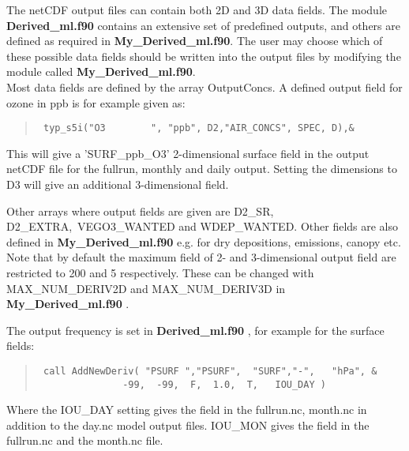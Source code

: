 % 

The netCDF output files can contain both 2D and 3D data fields. The module 
{ \bf Derived\_ml.f90 } contains an extensive set of predefined outputs, and
others are defined as required in { \bf My\_Derived\_ml.f90}. 
The user may choose which of these possible data fields should be written 
into the output files by modifying the module called { \bf My\_Derived\_ml.f90}.\\

Most data fields are defined by the array OutputConcs. A defined output 
field for ozone in ppb is for example given  as:
\begin{quote}
\begin{verbatim}
 typ_s5i("O3        ", "ppb", D2,"AIR_CONCS", SPEC, D),& 
\end{verbatim}
\end{quote}
This will give a 'SURF\_ppb\_O3' 2-dimensional surface field in the output netCDF file for 
the fullrun, monthly and daily output. 
Setting the dimensions to D3 will give an additional 3-dimensional field. 


Other arrays where output fields are given are D2\_SR, D2\_EXTRA,\
 VEGO3\_WANTED and 
WDEP\_WANTED. Other fields are also defined in { \bf My\_Derived\_ml.f90 } e.g. for dry 
depositions, emissions, canopy etc. \\



Note that by default the maximum field of 2- and 3-dimensional output field are 
restricted to 200 and 5 respectively. These can be changed with MAX\_NUM\_DERIV2D and MAX\_NUM\_DERIV3D 
in { \bf My\_Derived\_ml.f90 }.


The output frequency is set in { \bf Derived\_ml.f90 }, for example for the surface fields:
\begin{quote}
\begin{verbatim}
 call AddNewDeriv( "PSURF ","PSURF",  "SURF","-",   "hPa", &
               -99,  -99,  F,  1.0,  T,   IOU_DAY )
\end{verbatim}
\end{quote}
 Where the IOU\_DAY setting gives the field in the fullrun.nc, month.nc in addition to the day.nc 
model output files. IOU\_MON gives the field in the fullrun.nc and the month.nc file. 



